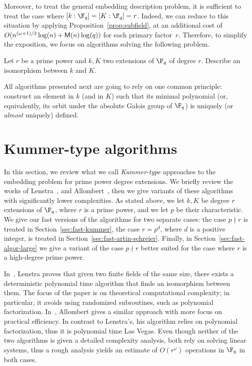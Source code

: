 Moreover, to treat the general embedding description problem,
it is sufficient to treat the case where $[k:\F_q]=[K:\F_q]=r$.
Indeed, we can reduce to this situation by applying
Proposition~\ref{prop:subfield}, at an additional cost of
$O(n^{(\omega+1)/2}\log(n) + \mathsf{M}(n)\log(q))$ for each primary factor~$r$.
Therefore, to simplify the exposition, we focus on algorithms
solving the following problem.
\begin{problem}
\label{prob:embedding}
Let $r$ be a prime power and $k, K$ two extensions of $\F_q$
of degree $r$.
Describe an isomorphism between $k$ and $K$.
\end{problem}
All algorithms presented next are going to rely on one common
principle: construct an element in $k$ (and in $K$) such that its
minimal polynomial (or, equivalently, its orbit under the absolute
Galois group of $\F_q$) is uniquely (or \emph{almost} uniquely)
defined.

\section{Kummer-type algorithms}
\label{sec:kummer}

In this section, we review what we call \emph{Kummer-type} approaches to the embedding problem for prime power degree extensions. 
We briefly review the works of Lenstra~\cite{LenstraJr91},
and Allombert~\cite{Allombert02,Allombert02-rev}, then 
we give variants of these algorithms with significantly lower complexities.
As stated above, we let $k, K$ be degree $r$ extensions of $\F_q$,
where $r$ is a prime power,
and we let $p$ be their characteristic.
We give our fast versions of the algorithms for two separate cases: the case $p \nmid r$
is treated in Section~\ref{sec:fast-kummer}, the case $r = p^d$, where $d$ 
is a positive integer, is treated in Section~\ref{sec:fast-artin-schreier}.
Finally, in Section~\ref{sec:fast-algor-large} we give a variant of the case
$p \nmid r$ better suited for the case where $r$ is a high-degree prime power.

In~\cite{LenstraJr91}, Lenstra proves that 
given two finite fields of the same size, there exists a deterministic polynomial time algorithm 
that finds an isomorphism between them.
The focus of the paper is on theoretical computational complexity;
in particular, it avoids using randomized subroutines, such as polynomial
factorization. 
In~\cite{Allombert02,Allombert02-rev}, Allombert gives a similar approach with more focus on practical efficiency.
In contrast to Lenstra's, his algorithm relies on polynomial factorization, thus it is
polynomial time Las Vegas.
Even though neither of the two algorithms is given a detailed complexity analysis, both rely
on solving linear systems, thus a rough analysis yields an estimate of $O(r^{\omega})$ operations
in $\F_q$ in both cases.


